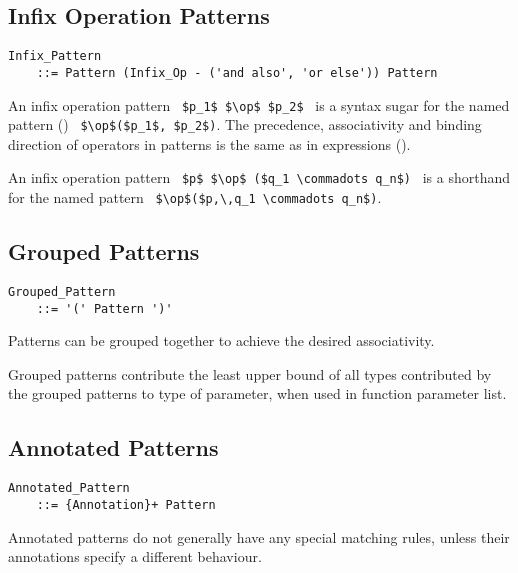 \subsection{Infix Operation Patterns}
\label{sec:infix-patterns}

\grammar\begin{lstlisting}
Infix_Pattern 
    ::= Pattern (Infix_Op - ('and also', 'or else')) Pattern
\end{lstlisting}

An infix operation pattern ~\lstinline!$p_1$ $\op$ $p_2$!~ is a syntax sugar for the named pattern () ~\lstinline!$\op$($p_1$, $p_2$)!. The precedence, associativity and binding direction of operators in patterns is the same as in expressions ().

An infix operation pattern ~\lstinline!$p$ $\op$ ($q_1 \commadots q_n$)!~ is a shorthand for the named pattern ~\lstinline!$\op$($p,\,q_1 \commadots q_n$)!.





\subsection{Grouped Patterns}
\label{sec:grouped-patterns}

\grammar\begin{lstlisting}
Grouped_Pattern 
    ::= '(' Pattern ')'
\end{lstlisting}

Patterns can be grouped together to achieve the desired associativity. 

Grouped patterns contribute the least upper bound of all types contributed by the grouped patterns to type of parameter, when used in function parameter list. 





\subsection{Annotated Patterns}
\label{sec:annotated-patterns}

\grammar\begin{lstlisting}
Annotated_Pattern 
    ::= {Annotation}+ Pattern
\end{lstlisting}

Annotated patterns do not generally have any special matching rules, unless their annotations specify a different behaviour. 





